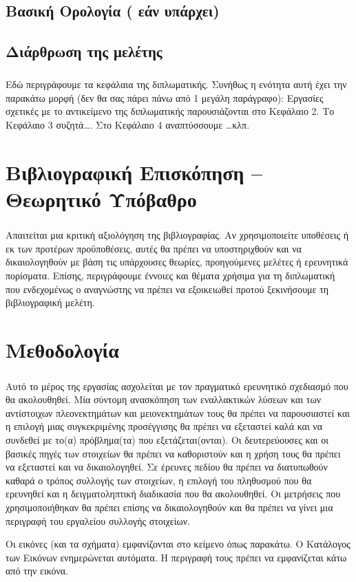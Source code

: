 \documentclass[12pt]{article}
\begin{document}
\subsection{Βασική Ορολογία ( εάν υπάρχει)}

\subsection{Διάρθρωση της μελέτης}
\subparagraph{}
Εδώ περιγράφουμε τα κεφάλαια της διπλωματικής. Συνήθως η ενότητα αυτή έχει την παρακάτω μορφή (δεν θα σας πάρει πάνω από 1 μεγάλη παράγραφο): Εργασίες σχετικές με το αντικείμενο της διπλωματικής παρουσιάζονται στο Κεφάλαιο 2. Το Κεφάλαιο 3 συζητά…. Στο Κεφάλαιο 4 αναπτύσσουμε …κλπ.

\clearpage
\section{Βιβλιογραφική Επισκόπηση – Θεωρητικό Υπόβαθρο}
\subparagraph{}
Απαιτείται μια κριτική αξιολόγηση της βιβλιογραφίας. Αν χρησιμοποιείτε υποθέσεις ή εκ των προτέρων προϋποθέσεις, αυτές θα πρέπει να υποστηριχθούν και να δικαιολογηθούν με βάση τις υπάρχουσες θεωρίες, προηγούμενες μελέτες ή ερευνητικά πορίσματα. Επίσης, περιγράφουμε έννοιες και θέματα χρήσιμα για τη διπλωματική που ενδεχομένως ο αναγνώστης να πρέπει να εξοικειωθεί προτού ξεκινήσουμε τη βιβλιογραφική μελέτη.

\clearpage
\section{Μεθοδολογία}
\subparagraph{}
Αυτό το μέρος της εργασίας ασχολείται με τον πραγματικό ερευνητικό σχεδιασμό που θα ακολουθηθεί. Μία σύντομη ανασκόπηση των εναλλακτικών λύσεων και των αντίστοιχων πλεονεκτημάτων και μειονεκτημάτων τους θα πρέπει να παρουσιαστεί και η επιλογή μιας συγκεκριμένης προσέγγισης θα πρέπει να εξεταστεί καλά και να συνδεθεί με το(α) πρόβλημα(τα) που εξετάζεται(ονται). Οι δευτερεύουσες και οι βασικές πηγές των στοιχείων θα πρέπει να καθοριστούν και η χρήση τους θα πρέπει να εξεταστεί και να δικαιολογηθεί. Σε έρευνες πεδίου θα πρέπει να διατυπωθούν καθαρά  ο τρόπος συλλογής των στοιχείων, η επιλογή του πληθυσμού που θα ερευνηθεί και η δειγματοληπτική διαδικασία που θα ακολουθηθεί. Οι μετρήσεις που χρησιμοποιήθηκαν θα πρέπει επίσης να δικαιολογηθούν και θα πρέπει να γίνει μια περιγραφή του εργαλείου συλλογής στοιχείων.

Οι εικόνες (και τα σχήματα) εμφανίζονται στο κείμενο όπως παρακάτω. Ο Κατάλογος των Εικόνων ενημερώνεται αυτόματα. Η περιγραφή τους πρέπει να εμφανίζεται κάτω από την εικόνα.
\end{document}
